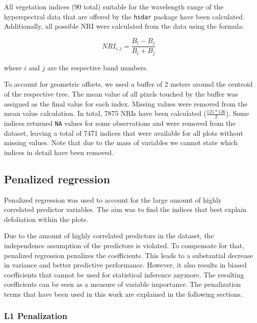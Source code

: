 \documentclass[review]{elsarticle}
\begin{document}
All vegetation indices (90 total) suitable for the wavelength range of the hyperspectral data that are offered by the \texttt{hsdar} package have been calculated.
Additionally, all possible \ac{NRI} were calculated from the data using the formula:

\begin{equation}
	NRI_{i,j} = \frac{B_{i} - B_{j}}{B_{i} + B_{j}}
\end{equation}

\noindent
where $i$ and $j$ are the respective band numbers.

To account for geometric offsets, we used a buffer of 2 meters around the centroid of the respective tree.
The mean value of all pixels touched by the buffer was assigned as the final value for each index.
Missing values were removed from the mean value calculation.
In total, 7875 \ac{NRI}s have been calculated ($\frac{125*126}{2}$).
Some indices returned \texttt{NA} values for some observations and were removed from the dataset, leaving a total of 7471 indices that were available for all plots without missing values.
Note that due to the mass of variables we cannot state which indices in detail have been removed.

\subsection{Penalized regression}

Penalized regression was used to account for the large amount of highly correlated predictor variables.
The aim was to find the indices that best explain defoliation within the plots.

Due to the amount of highly correlated predictors in the dataset, the independence assumption of the predictors is violated.
To compensate for that, penalized regression penalizes the coefficients.
This leads to a substantial decrease in variance and better predictive performance.
However, it also results in biased coefficients that cannot be used for statistical inference anymore.
The resulting coefficients can be seen as a measure of variable importance.
The penalization terms that have been used in this work are explained in the following sections.

\subsubsection{L1 Penalization}
\end{document}

